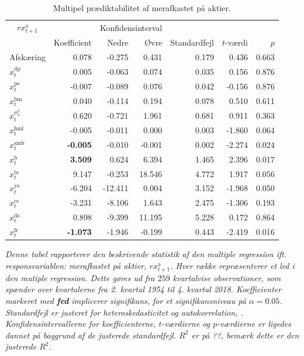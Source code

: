 \documentclass[
  a4paper,
  oneside]{memoir}
\begin{document}
\begin{table}[H]

\caption{\label{tab:MULT-ak}Multipel prædiktabilitet af merafkastet på aktier.}
\centering
\begin{threeparttable}
\begin{tabular}[t]{lrrrrrr}
\toprule
\multicolumn{1}{c}{$rx_{t+1}^{\text{a}}$} & \multicolumn{1}{c}{ } & \multicolumn{2}{c}{Konfidensinterval} & \multicolumn{3}{c}{ } \\
\cmidrule(l{3pt}r{3pt}){1-1} \cmidrule(l{3pt}r{3pt}){3-4}
  & Koefficient & Nedre & Øvre & Standardfejl & $t$-værdi & $p$\\
\midrule
\rowcolor{gray!6}  Afskæring & 0.078 & -0.275 & 0.431 & 0.179 & 0.436 & 0.663\\
$x_t^{\text{dp}}$ & 0.005 & -0.063 & 0.074 & 0.035 & 0.156 & 0.876\\
\rowcolor{gray!6}  $x_t^{\text{pe}}$ & -0.007 & -0.089 & 0.076 & 0.042 & -0.156 & 0.876\\
$x_t^{\text{bm}}$ & 0.040 & -0.114 & 0.194 & 0.078 & 0.510 & 0.611\\
\rowcolor{gray!6}  $x_t^{\sigma_{\text{a}}^2}$ & 0.620 & -0.721 & 1.961 & 0.681 & 0.911 & 0.363\\
$x_t^{\text{hml}}$ & -0.005 & -0.011 & 0.000 & 0.003 & -1.860 & 0.064\\
\rowcolor{gray!6}  $x_t^{\text{smb}}$ & \textbf{-0.005} & -0.010 & -0.001 & 0.002 & -2.274 & 0.024\\
$x_t^{\text{b}}$ & \textbf{ 3.509} & 0.624 & 6.394 & 1.465 & 2.396 & 0.017\\
\rowcolor{gray!6}  $x_t^{\text{ts}}$ & 9.147 & -0.253 & 18.546 & 4.772 & 1.917 & 0.056\\
$x_t^{\text{ys}}$ & -6.204 & -12.411 & 0.004 & 3.152 & -1.968 & 0.050\\
\rowcolor{gray!6}  $x_t^{\text{cs}}$ & -3.231 & -8.106 & 1.643 & 2.475 & -1.306 & 0.193\\
$x_t^{\text{ds}}$ & 0.898 & -9.399 & 11.195 & 5.228 & 0.172 & 0.864\\
\rowcolor{gray!6}  $x_t^{\text{fr}}$ & \textbf{-1.073} & -1.946 & -0.199 & 0.443 & -2.419 & 0.016\\
\bottomrule
\end{tabular}
\begin{tablenotes}
\item \textit{Denne tabel rapporterer den beskrivende statistik af den multiple regression ift. responsvariablen: merafkastet på aktier, $rx_{t+1}^{\text{a}}$. Hver række repræsenterer et led i den mutiple regression. Dette gøres ud fra $259$ kvartalvise observationer, som spænder over kvartalerne fra 2. kvartal 1954 til 4. kvartal 2018. Koefficienter markeret med \textbf{fed} implicerer signifikans, for et signifikansniveau på $\alpha=0.05$. Standardfejl er justeret for heteroskedasticitet og autokorrelation, \citep{Newey1987}. Konfidensintervallerne for koefficienterne, $t$-værdierne og $p$-værdierne er ligedes dannet på baggrund af de justerede standardfejl. $R^2$ er på ??, bemærk dette er den justerede $R^2$.}
\end{tablenotes}
\end{threeparttable}
\end{table}
\end{document}
